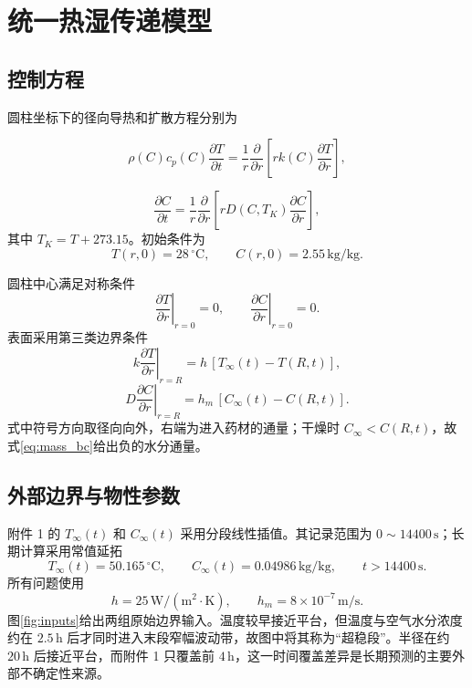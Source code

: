 \documentclass[UTF8,a4paper,zihao=-4,fontset=fandol]{ctexart}
\newcommand{\unit}[1]{\,\mathrm{#1}}
\begin{document}
\section{统一热湿传递模型}

\subsection{控制方程}

圆柱坐标下的径向导热和扩散方程分别为\cite{bergman2018,crank1975}

\begin{equation}
\rho(C)c_p(C)\frac{\partial T}{\partial t}
=\frac{1}{r}\frac{\partial}{\partial r}
\left[rk(C)\frac{\partial T}{\partial r}\right],
\label{eq:heat}
\end{equation}

\begin{equation}
\frac{\partial C}{\partial t}
=\frac{1}{r}\frac{\partial}{\partial r}
\left[rD(C,T_K)\frac{\partial C}{\partial r}\right],
\label{eq:mass}
\end{equation}
其中 $T_K=T+273.15$。初始条件为
\begin{equation}
T(r,0)=28\,^{\circ}\mathrm{C},\qquad C(r,0)=2.55\unit{kg/kg}.
\label{eq:initial}
\end{equation}

圆柱中心满足对称条件
\begin{equation}
\left.\frac{\partial T}{\partial r}\right|_{r=0}=0,
\qquad
\left.\frac{\partial C}{\partial r}\right|_{r=0}=0.
\label{eq:center_bc}
\end{equation}
表面采用第三类边界条件
\begin{equation}
k\left.\frac{\partial T}{\partial r}\right|_{r=R}
=h\,[T_\infty(t)-T(R,t)],
\label{eq:heat_bc}
\end{equation}
\begin{equation}
D\left.\frac{\partial C}{\partial r}\right|_{r=R}
=h_m\,[C_\infty(t)-C(R,t)].
\label{eq:mass_bc}
\end{equation}
式中符号方向取径向向外，右端为进入药材的通量；干燥时 $C_\infty<C(R,t)$，故式\eqref{eq:mass_bc}给出负的水分通量。

\subsection{外部边界与物性参数}

附件 1 的 $T_\infty(t)$ 和 $C_\infty(t)$ 采用分段线性插值。其记录范围为 $0\sim14400\unit{s}$；长期计算采用常值延拓
\begin{equation}
T_\infty(t)=50.165\,^{\circ}\mathrm{C},\qquad
C_\infty(t)=0.04986\unit{kg/kg},\qquad t>14400\unit{s}.
\label{eq:air_extension}
\end{equation}
所有问题使用
\begin{equation}
h=25\unit{W/(m^2\cdot K)},\qquad h_m=8\times10^{-7}\unit{m/s}.
\label{eq:boundary_coeff}
\end{equation}
图\ref{fig:inputs}给出两组原始边界输入。温度较早接近平台，但温度与空气水分浓度约在 $2.5\unit{h}$ 后才同时进入末段窄幅波动带，故图中将其称为“超稳段”。半径在约 $20\unit{h}$ 后接近平台，而附件 1 只覆盖前 $4\unit{h}$，这一时间覆盖差异是长期预测的主要外部不确定性来源。
\end{document}
